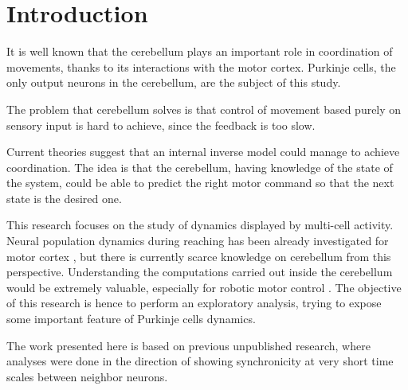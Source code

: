 \section{Introduction}

It is well known that the cerebellum plays an important role in coordination of movements, thanks to its interactions with the motor cortex. Purkinje cells, the only output neurons in the cerebellum, are the subject of this study. 

The problem that cerebellum solves is that control of movement based purely on sensory input is hard to achieve, since the feedback is too slow.

Current theories suggest that an internal inverse model \cite{wolpert1998internal} could manage to achieve coordination. The idea is that the cerebellum, having knowledge of the state of the system, could be able to predict the right motor command so that the next state is the desired one.

This research focuses on the study of dynamics displayed by multi-cell activity. Neural population dynamics during reaching has been already investigated for motor cortex \cite{churchland2012neural}, but there is currently scarce knowledge on cerebellum from this perspective.
Understanding the computations carried out inside the cerebellum would be extremely valuable, especially for robotic motor control \cite{casellato2014adaptive}. The objective of this research is hence to perform an exploratory analysis, trying to expose some important feature of Purkinje cells dynamics.

The work presented here is based on previous unpublished research, where analyses were done in the direction of showing synchronicity at very short time scales between neighbor neurons. 
